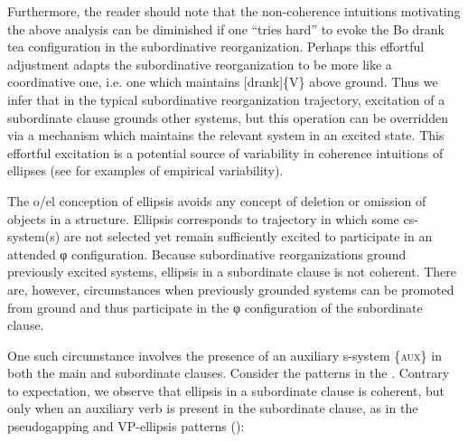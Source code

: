   Furthermore, the reader should note that the non-coherence intuitions motivating the above analysis can be diminished if one “tries hard” to evoke the {\textbar}Bo drank tea{\textbar} configuration in the subordinative reorganization. Perhaps this effortful adjustment adapts the subordinative reorganization to be more like a coordinative one, i.e. one which maintains [drank]\{V\} above ground. Thus we infer that in the typical subordinative reorganization trajectory, excitation of a subordinate clause grounds other systems, but this operation can be overridden via a mechanism which maintains the relevant system in an excited state. This effortful excitation is a potential source of variability in coherence intuitions of ellipses (see \citealt{FrazierClifton2005,Phillips2003,PhillipsParker2014} for examples of empirical variability). 

  The o/el conception of ellipsis avoids any concept of deletion or omission of objects in a structure. Ellipsis corresponds to trajectory in which some cs-system(s) are not selected yet remain sufficiently excited to participate in an attended φ configuration. Because subordinative reorganizations ground previously excited systems, ellipsis in a subordinate clause is not coherent. There are, however, circumstances when previously grounded systems can be promoted from ground and thus participate in the φ configuration of the subordinate clause. 

  One such circumstance involves the presence of an auxiliary s-system \{\textsc{aux}\} in both the main and subordinate clauses. Consider the patterns in the {\tablebelow}. Contrary to expectation, we observe that ellipsis in a subordinate clause is coherent, but only when an auxiliary verb is present in the subordinate clause, as in the pseudogapping and VP-ellipsis patterns (\citealt{Johnson2001,Johnson2009,Merchant2001}):

  
  
